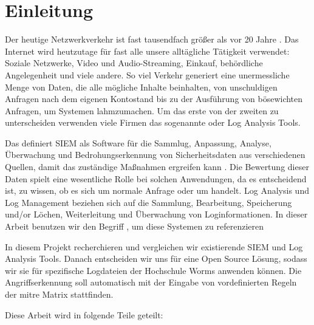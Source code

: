 \section{Einleitung}

Der heutige Netzwerkverkehr ist fast tausendfach größer als vor 20 Jahre \citep{Roser_I}. Das Internet wird heutzutage für fast alle unsere alltägliche Tätigkeit verwendet: Soziale Netzwerke, Video und Audio-Streaming, Einkauf, behördliche Angelegenheit und viele andere. So viel Verkehr generiert eine unermessliche Menge von Daten, die alle mögliche Inhalte beinhalten, von unschuldigen Anfragen nach dem eigenen Kontostand bis zu der Ausführung von bösewichten Anfragen, um Systemen lahmzumachen. Um das erste von der zweiten zu unterscheiden verwenden viele Firmen das sogenannte  oder Log Analysis Tools.

Das  definiert \acrshort{SIEM} als Software für die Sammlug, Anpassung, Analyse, Überwachung und Bedrohungserkennung von Sicherheitsdaten aus verschiedenen Quellen, damit das zuständige  Maßnahmen ergreifen kann \citep{NIST_Definitions}. Die Bewertung dieser Daten spielt eine wesentliche Rolle bei solchen Anwendungen, da es entscheidend ist, zu wissen, ob es sich um normale Anfrage oder um  handelt. Log Analysis und Log Management beziehen sich auf die Sammlung, Bearbeitung, Speicherung und/or Löchen, Weiterleitung und Überwachung von Loginformationen. In dieser Arbeit benutzen wir den Begriff , um diese Systemen zu referenzieren

In diesem Projekt recherchieren und vergleichen wir  existierende \gls{SIEM} und Log Analysis Tools. Danach entscheiden wir uns für eine \gls{Open Source} Lösung, sodass wir sie für spezifische Logdateien der Hochschule Worms anwenden können. Die Angriffserkennung soll automatisch mit der Eingabe von vordefinierten Regeln der \gls{mitre} Matrix stattfinden.

Diese Arbeit wird in folgende Teile geteilt:





